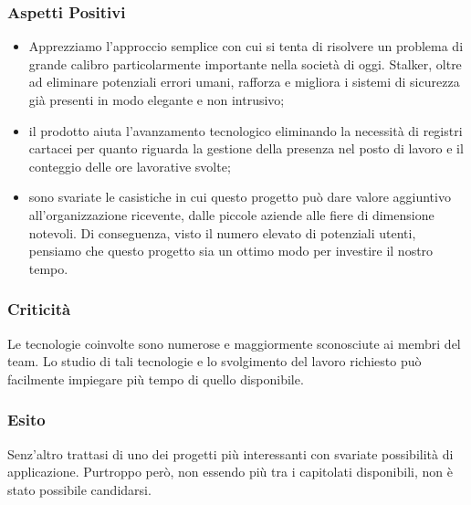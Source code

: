	\subsubsection{Aspetti Positivi}
	\begin{itemize}
		\item Apprezziamo l'approccio semplice con cui si tenta di risolvere un problema di grande calibro particolarmente importante nella società di oggi. Stalker, oltre ad eliminare potenziali errori umani, rafforza e migliora i sistemi di sicurezza già presenti in modo elegante e non intrusivo; 
		\item il prodotto aiuta l'avanzamento tecnologico eliminando la necessità di registri cartacei per quanto riguarda la gestione della presenza nel posto di lavoro e il conteggio delle ore lavorative svolte; 
		\item sono svariate le casistiche in cui questo progetto può dare valore aggiuntivo all'organizzazione ricevente, dalle piccole aziende alle fiere di dimensione notevoli. Di conseguenza, visto il numero elevato di potenziali utenti, pensiamo che questo progetto sia un ottimo modo per investire il nostro tempo.
	\end{itemize}

	\subsubsection{Criticità}
		Le tecnologie coinvolte sono numerose e maggiormente sconosciute ai membri del team. Lo studio di tali tecnologie e lo svolgimento del lavoro richiesto può facilmente impiegare più tempo di quello disponibile.
	
	\subsubsection{Esito}
		Senz'altro trattasi di uno dei progetti più interessanti con svariate possibilità di applicazione. Purtroppo però, non essendo più tra i capitolati disponibili, non è stato possibile candidarsi.